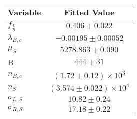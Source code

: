 \begin{tabular}[t]{lc}
\hline
Variable &Fitted Value\\
\hline\hline
$f_{\frac{L}{R}}$&$0.406\pm0.022$\\
\hline
$\lambda_{B,c}$&$-0.00195\pm0.00052$\\
\hline
$\mu_S$&$5278.863\pm0.090$\\
\hline
B&$444\pm31$\\
\hline
$n_{B,c}$&$(1.72\pm0.12)\times 10^3$\\
\hline
$n_S$&$(3.574\pm0.022)\times 10^4$\\
\hline
$\sigma_{L, S}$&$10.82\pm0.24$\\
\hline
$\sigma_{R, S}$&$17.18\pm0.22$\\
\hline
\end{tabular}